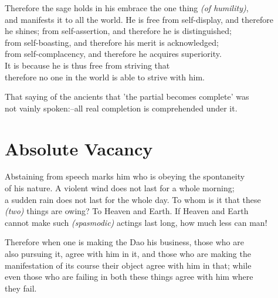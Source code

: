     Therefore the sage holds in his embrace the one thing \textit{(of humility)},\\ 
    and manifests it to all the world. He is free from self-display, and therefore\\
    he shines; from self-assertion, and therefore he is distinguished;\\
    from self-boasting, and therefore his merit is acknowledged;\\
    from self-complacency, and therefore he acquires superiority.\\
    It is because he is thus free from striving that\\
    therefore no one in the world is able to strive with him.\vspace{\baselineskip}
    
    That saying of the ancients that 'the partial becomes complete' was\\
    not vainly spoken:--all real completion is comprehended under it.\vspace{\baselineskip}
    
\section*{Absolute Vacancy}
    Abstaining from speech marks him who is obeying the spontaneity\\
    of his nature. A violent wind does not last for a whole morning;\\
    a sudden rain does not last for the whole day. To whom is it that these\\
    \textit{(two)} things are owing? To Heaven and Earth. If Heaven and Earth\\
    cannot make such \textit{(spasmodic)} actings last long, how much less can man!\vspace{\baselineskip}
    
    Therefore when one is making the Dao his business, those who are\\
    also pursuing it, agree with him in it, and those who are making the\\
    manifestation of its course their object agree with him in that; while\\
    even those who are failing in both these things agree with him where\\
    they fail.\vspace{\baselineskip}
    

